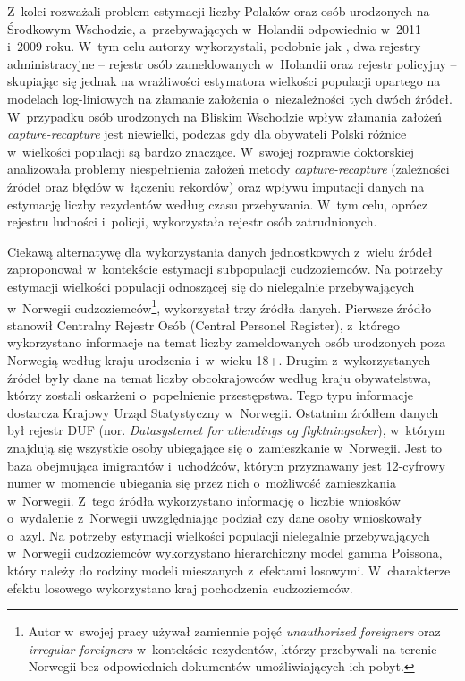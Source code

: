 \documentclass[12pt,a4paper]{article}
\begin{document}
Z~kolei \citet{gerritse2015sensitivity} rozważali problem estymacji liczby Polaków oraz osób urodzonych na Środkowym Wschodzie, a~przebywających w~Holandii odpowiednio w~2011 i~2009 roku. W~tym celu autorzy wykorzystali, podobnie jak \citet{van2012people}, dwa rejestry administracyjne -- rejestr osób zameldowanych w~Holandii oraz rejestr policyjny -- skupiając się jednak na wrażliwości estymatora wielkości populacji opartego na modelach log-liniowych na złamanie założenia o~niezależności tych dwóch źródeł. W~przypadku osób urodzonych na Bliskim Wschodzie wpływ złamania założeń \textit{capture-recapture} jest niewielki, podczas gdy dla obywateli Polski różnice w~wielkości populacji są bardzo znaczące. W~swojej rozprawie doktorskiej \citet{gerritse2016application} analizowała problemy niespełnienia założeń metody \textit{capture-recapture} (zależności źródeł oraz błędów w~łączeniu rekordów) oraz wpływu imputacji danych na estymację liczby rezydentów według czasu przebywania. W~tym celu, oprócz rejestru ludności i~policji, wykorzystała rejestr osób zatrudnionych. 

Ciekawą alternatywę dla wykorzystania danych jednostkowych z~wielu źródeł zaproponował \citet{zhang2008developing} w~kontekście estymacji subpopulacji cudzoziemców. Na potrzeby estymacji wielkości populacji odnoszącej się do nielegalnie przebywających w~Norwegii cudzoziemców\footnote{Autor w~swojej pracy używał zamiennie  pojęć \textit{unauthorized foreigners} oraz \textit{irregular foreigners} w~kontekście rezydentów, którzy przebywali na terenie Norwegii bez odpowiednich dokumentów umożliwiających ich pobyt.}, \citeauthor{zhang2008developing} wykorzystał trzy źródła danych. Pierwsze źródło stanowił Centralny Rejestr Osób (Central Personel Register), z~którego wykorzystano informacje na temat liczby zameldowanych osób urodzonych poza Norwegią według kraju urodzenia i~w~wieku 18+. Drugim z~wykorzystanych źródeł były dane na temat liczby obcokrajowców według kraju obywatelstwa, którzy zostali oskarżeni o~popełnienie przestępstwa. Tego typu informacje dostarcza Krajowy Urząd Statystyczny w~Norwegii. Ostatnim źródłem danych był rejestr DUF (nor. \textit{Datasystemet for utlendings og flyktningsaker}), w~którym znajdują się wszystkie osoby ubiegające się o~zamieszkanie w~Norwegii. Jest to baza obejmująca imigrantów i~uchodźców, którym przyznawany jest 12-cyfrowy numer w~momencie ubiegania się przez nich o~możliwość zamieszkania w~Norwegii. Z~tego źródła wykorzystano informację o~liczbie wniosków o~wydalenie z~Norwegii uwzględniając podział czy dane osoby wnioskowały o~azyl. Na potrzeby estymacji wielkości populacji nielegalnie przebywających w~Norwegii cudzoziemców wykorzystano hierarchiczny model gamma Poissona, który należy do rodziny modeli mieszanych z~efektami losowymi. W~charakterze efektu losowego wykorzystano kraj pochodzenia cudzoziemców.
\end{document}
